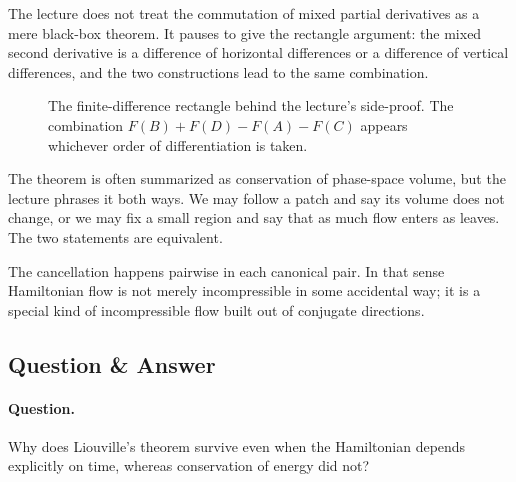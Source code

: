The lecture does not treat the commutation of mixed partial derivatives as a mere black-box theorem. It pauses to give the rectangle argument: the mixed second derivative is a difference of horizontal differences or a difference of vertical differences, and the two constructions lead to the same combination.

\begin{figure}[h]
\centering
{}
\caption{The finite-difference rectangle behind the lecture's side-proof. The combination \(F(B)+F(D)-F(A)-F(C)\) appears whichever order of differentiation is taken.}
\end{figure}

The theorem is often summarized as conservation of phase-space volume, but the lecture phrases it both ways. We may follow a patch and say its volume does not change, or we may fix a small region and say that as much flow enters as leaves. The two statements are equivalent.

\begin{remark}
The cancellation happens pairwise in each canonical pair. In that sense Hamiltonian flow is not merely incompressible in some accidental way; it is a special kind of incompressible flow built out of conjugate directions.
\end{remark}

\subsection{Question \& Answer}

\paragraph{Question.} Why does Liouville's theorem survive even when the Hamiltonian depends explicitly on time, whereas conservation of energy did not?

